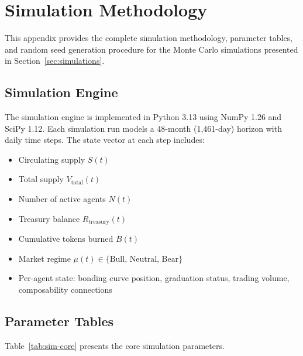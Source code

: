 \section{Simulation Methodology}
\label{app:simulation}

This appendix provides the complete simulation methodology, parameter tables,
and random seed generation procedure for the Monte Carlo simulations presented
in Section~\ref{sec:simulations}.

\subsection{Simulation Engine}
\label{subsec:sim-engine}

The simulation engine is implemented in Python 3.13 using NumPy 1.26 and
SciPy 1.12. Each simulation run models a 48-month (1{,}461-day) horizon with
daily time steps. The state vector at each step includes:

\begin{itemize}
  \item Circulating supply $S(t)$
  \item Total \veCORTEX{} supply $V_{\text{total}}(t)$
  \item Number of active agents $N(t)$
  \item Treasury balance $R_{\text{treasury}}(t)$
  \item Cumulative tokens burned $B(t)$
  \item Market regime $\mu(t) \in \{\text{Bull, Neutral, Bear}\}$
  \item Per-agent state: bonding curve position, graduation status, trading
    volume, composability connections
\end{itemize}

\subsection{Parameter Tables}
\label{subsec:sim-params}

Table~\ref{tab:sim-core} presents the core simulation parameters.

